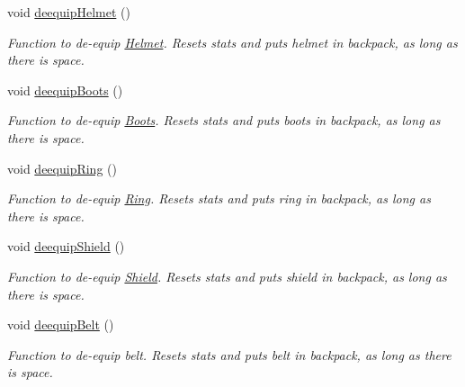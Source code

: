 \begin{DoxyCompactItemize}
\hypertarget{class_fighter_a9e6f83324d66e6467d8af19e91c13781}{}\label{class_fighter_a9e6f83324d66e6467d8af19e91c13781} 
void \hyperlink{class_fighter_a9e6f83324d66e6467d8af19e91c13781}{deequip\+Helmet} ()
\begin{DoxyCompactList}\small\item\em Function to de-\/equip \hyperlink{class_helmet}{Helmet}. Resets stats and puts helmet in backpack, as long as there is space. \end{DoxyCompactList}\item 
\hypertarget{class_fighter_add80df04f0659d37c0e30e91314e3d5e}{}\label{class_fighter_add80df04f0659d37c0e30e91314e3d5e} 
void \hyperlink{class_fighter_add80df04f0659d37c0e30e91314e3d5e}{deequip\+Boots} ()
\begin{DoxyCompactList}\small\item\em Function to de-\/equip \hyperlink{class_boots}{Boots}. Resets stats and puts boots in backpack, as long as there is space. \end{DoxyCompactList}\item 
\hypertarget{class_fighter_a1b64aab99d09a1d9a31b8674b4d0176c}{}\label{class_fighter_a1b64aab99d09a1d9a31b8674b4d0176c} 
void \hyperlink{class_fighter_a1b64aab99d09a1d9a31b8674b4d0176c}{deequip\+Ring} ()
\begin{DoxyCompactList}\small\item\em Function to de-\/equip \hyperlink{class_ring}{Ring}. Resets stats and puts ring in backpack, as long as there is space. \end{DoxyCompactList}\item 
\hypertarget{class_fighter_a313e661908412be41e7f3f67c3c050f4}{}\label{class_fighter_a313e661908412be41e7f3f67c3c050f4} 
void \hyperlink{class_fighter_a313e661908412be41e7f3f67c3c050f4}{deequip\+Shield} ()
\begin{DoxyCompactList}\small\item\em Function to de-\/equip \hyperlink{class_shield}{Shield}. Resets stats and puts shield in backpack, as long as there is space. \end{DoxyCompactList}\item 
\hypertarget{class_fighter_a529fdd57ee79c761a7601356f861d7fb}{}\label{class_fighter_a529fdd57ee79c761a7601356f861d7fb} 
void \hyperlink{class_fighter_a529fdd57ee79c761a7601356f861d7fb}{deequip\+Belt} ()
\begin{DoxyCompactList}\small\item\em Function to de-\/equip belt. Resets stats and puts belt in backpack, as long as there is space. \end{DoxyCompactList}\item 

\end{DoxyCompactItemize}
